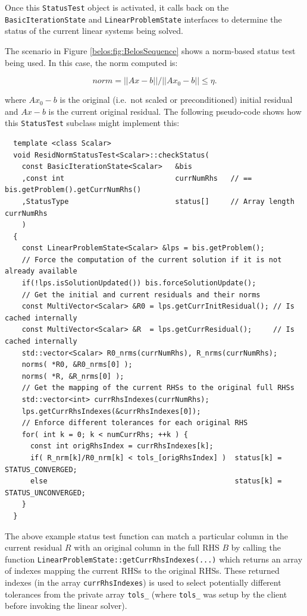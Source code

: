 \documentclass[pdf,ps2pdf,11pt]{SANDreport}
\begin{document}
\begin{enumerate}
Once this {}\texttt{Status\-Test} object is activated, it calls back
on the {}\texttt{Basic\-Iteration\-State} and
{}\texttt{Linear\-Problem\-State} interfaces to determine the status of
the current linear systems being solved.

The scenario in Figure {}\ref{belos:fig:BelosSequence} shows a
norm-based status test being used.  In this case, the norm computed
is:

\[
  norm = ||A x - b|| / ||A x_0 - b|| \leq \eta.
\]

{}\noindent{}where $A x_0 - b$ is the original (i.e.~not scaled or
preconditioned) initial residual and $A x - b$ is the current original
residual.  The following pseudo-code shows how this
{}\texttt{Status\-Test} subclass might implement this:

{\scriptsize\begin{verbatim}
  template <class Scalar>
  void ResidNormStatusTest<Scalar>::checkStatus(
    const BasicIterationState<Scalar>   &bis
    ,const int                          currNumRhs   // == bis.getProblem().getCurrNumRhs()
    ,StatusType                         status[]     // Array length currNumRhs
    )
  {
    const LinearProblemState<Scalar> &lps = bis.getProblem();
    // Force the computation of the current solution if it is not already available
    if(!lps.isSolutionUpdated()) bis.forceSolutionUpdate();
    // Get the initial and current residuals and their norms
    const MultiVector<Scalar> &R0 = lps.getCurrInitResidual(); // Is cached internally
    const MultiVector<Scalar> &R  = lps.getCurrResidual();     // Is cached internally
    std::vector<Scalar> R0_nrms(currNumRhs), R_nrms(currNumRhs);
    norms( *R0, &R0_nrms[0] ); 
    norms( *R, &R_nrms[0] );
    // Get the mapping of the current RHSs to the original full RHSs
    std::vector<int> currRhsIndexes(currNumRhs);
    lps.getCurrRhsIndexes(&currRhsIndexes[0]);
    // Enforce different tolerances for each original RHS
    for( int k = 0; k < numCurrRhs; ++k ) {
      const int origRhsIndex = currRhsIndexes[k];
      if( R_nrm[k]/R0_nrm[k] < tols_[origRhsIndex] )  status[k] = STATUS_CONVERGED;
      else                                            status[k] = STATUS_UNCONVERGED;
    }
  }
\end{verbatim}}

The above example status test function can match a particular column
in the current residual $R$ with an original column in the full RHS
$B$ by calling the function
{}\texttt{Linear\-Problem\-State::\-getCurrRhsIndexes(...)}  which
returns an array of indexes mapping the current RHSs to the original
RHSs.  These returned indexes (in the array {}\texttt{currRhsIndexes})
is used to select potentially different tolerances from the private
array {}\texttt{tols\_} (where {}\texttt{tols\_} was setup by the
client before invoking the linear solver).


\end{enumerate}
\end{document}
